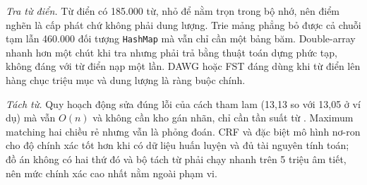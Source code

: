 \documentclass[9pt,twocolumn,a4paper]{extarticle}
\newcommand{\code}[1]{\texttt{#1}}
\begin{document}
\emph{Tra từ điển.} Từ điển có 185.000 từ, nhỏ để nằm trọn trong bộ nhớ, nên điểm nghẽn là cấp phát chứ không phải dung lượng. Trie mảng phẳng bỏ được cả chuỗi tạm lẫn 460.000 đối tượng \code{HashMap} mà vẫn chỉ cần một bảng băm. Double-array nhanh hơn một chút khi tra nhưng phải trả bằng thuật toán dựng phức tạp, không đáng với từ điển nạp một lần. DAWG hoặc FST đáng dùng khi từ điển lên hàng chục triệu mục và dung lượng là ràng buộc chính.

\emph{Tách từ.} Quy hoạch động sửa đúng lỗi của cách tham lam (13,13 so với 13,05 ở ví dụ) mà vẫn $O(n)$ và không cần kho gán nhãn, chỉ cần tần suất từ \cite{coccoctokenizer}. Maximum matching hai chiều rẻ nhưng vẫn là phỏng đoán. CRF và đặc biệt mô hình nơ-ron cho độ chính xác tốt hơn khi có dữ liệu huấn luyện và đủ tài nguyên tính toán; đồ án không có hai thứ đó và bộ tách từ phải chạy nhanh trên 5 triệu âm tiết, nên mức chính xác cao nhất nằm ngoài phạm vi.
\end{document}
